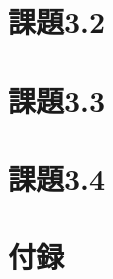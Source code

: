 \documentclass[11pt]{jsarticle}
\begin{document}
    \section{課題3.2}

    \section{課題3.3}

    \section{課題3.4}

    \section{付録}
\end{document}
